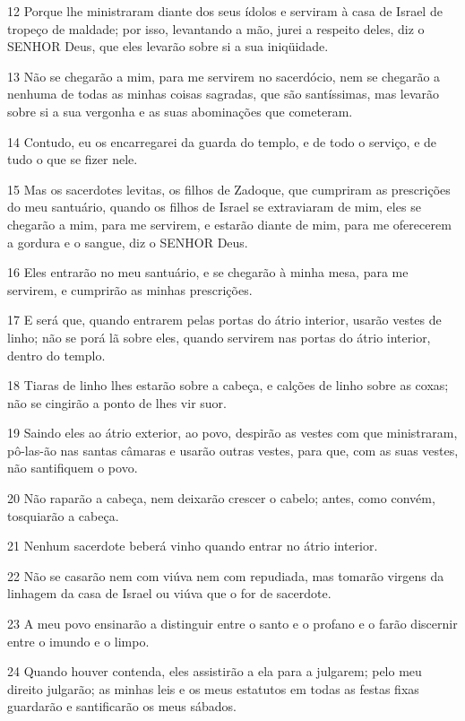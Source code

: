 \par 12 Porque lhe ministraram diante dos seus ídolos e serviram à casa de Israel de tropeço de maldade; por isso, levantando a mão, jurei a respeito deles, diz o SENHOR Deus, que eles levarão sobre si a sua iniqüidade.
\par 13 Não se chegarão a mim, para me servirem no sacerdócio, nem se chegarão a nenhuma de todas as minhas coisas sagradas, que são santíssimas, mas levarão sobre si a sua vergonha e as suas abominações que cometeram.
\par 14 Contudo, eu os encarregarei da guarda do templo, e de todo o serviço, e de tudo o que se fizer nele.
\par 15 Mas os sacerdotes levitas, os filhos de Zadoque, que cumpriram as prescrições do meu santuário, quando os filhos de Israel se extraviaram de mim, eles se chegarão a mim, para me servirem, e estarão diante de mim, para me oferecerem a gordura e o sangue, diz o SENHOR Deus.
\par 16 Eles entrarão no meu santuário, e se chegarão à minha mesa, para me servirem, e cumprirão as minhas prescrições.
\par 17 E será que, quando entrarem pelas portas do átrio interior, usarão vestes de linho; não se porá lã sobre eles, quando servirem nas portas do átrio interior, dentro do templo.
\par 18 Tiaras de linho lhes estarão sobre a cabeça, e calções de linho sobre as coxas; não se cingirão a ponto de lhes vir suor.
\par 19 Saindo eles ao átrio exterior, ao povo, despirão as vestes com que ministraram, pô-las-ão nas santas câmaras e usarão outras vestes, para que, com as suas vestes, não santifiquem o povo.
\par 20 Não raparão a cabeça, nem deixarão crescer o cabelo; antes, como convém, tosquiarão a cabeça.
\par 21 Nenhum sacerdote beberá vinho quando entrar no átrio interior.
\par 22 Não se casarão nem com viúva nem com repudiada, mas tomarão virgens da linhagem da casa de Israel ou viúva que o for de sacerdote.
\par 23 A meu povo ensinarão a distinguir entre o santo e o profano e o farão discernir entre o imundo e o limpo.
\par 24 Quando houver contenda, eles assistirão a ela para a julgarem; pelo meu direito julgarão; as minhas leis e os meus estatutos em todas as festas fixas guardarão e santificarão os meus sábados.
